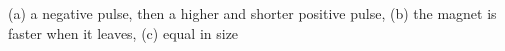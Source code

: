 (a) a negative pulse, then a higher and shorter positive pulse, (b) the magnet is faster when it leaves, (c) equal in size
